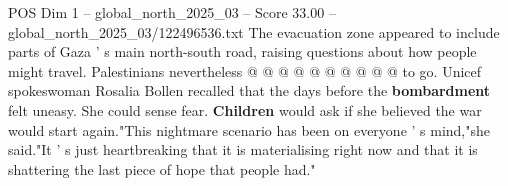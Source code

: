\begin{textsample}{POS Dim 1 – global\_north\_2025\_03 – Score 33.00 – global\_north\_2025\_03/122496536.txt}
The evacuation zone appeared to include parts of Gaza ' s main north-south road, raising questions about how people might travel.
Palestinians nevertheless @ @ @ @ @ @ @ @ @ @ to go.
Unicef spokeswoman Rosalia Bollen recalled that the days before the \textbf{bombardment} felt uneasy.
She could sense fear. \textbf{Children} would ask if she believed the war would start again."This nightmare scenario has been on everyone ' s mind,"she said."It ' s just heartbreaking that it is materialising right now and that it is shattering the last piece of hope that people had."

\end{textsample}
